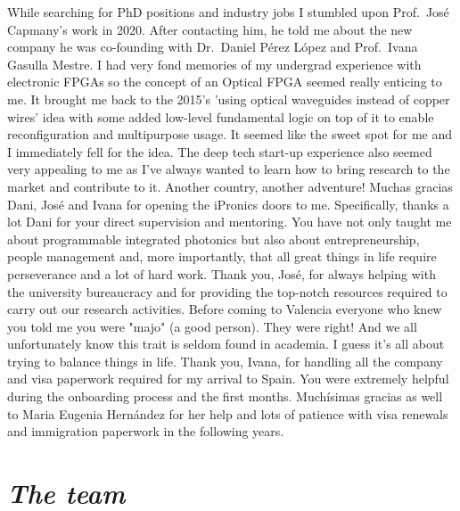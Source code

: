 While searching for PhD positions and industry jobs I stumbled upon Prof.~José Capmany's work in 2020.
After contacting him, he told me about the new company he was co-founding with Dr.~Daniel Pérez López and Prof.~Ivana Gasulla Mestre.
I had very fond memories of my undergrad experience with electronic FPGAs so the concept of an Optical FPGA seemed really enticing to me.
It brought me back to the 2015's 'using optical waveguides instead of copper wires' idea with some added low-level fundamental logic on top of it to enable reconfiguration and multipurpose usage.
It seemed like the sweet spot for me and I immediately fell for the idea.
The deep tech start-up experience also seemed very appealing to me as I've always wanted to learn how to bring research to the market and contribute to it.
Another country, another adventure!
Muchas gracias Dani, José and Ivana for opening the iPronics doors to me.
Specifically, thanks a lot Dani for your direct supervision and mentoring.
You have not only taught me about programmable integrated photonics but also about entrepreneurship, people management and, more importantly, that all great things in life require perseverance and a lot of hard work.
Thank you, José, for always helping with the university bureaucracy and for providing the top-notch resources required to carry out our research activities.
Before coming to Valencia everyone who knew you told me you were "majo" (a good person).
They were right!
And we all unfortunately know this trait is seldom found in academia.
I guess it's all about trying to balance things in life.
Thank you, Ivana, for handling all the company and visa paperwork required for my arrival to Spain.
You were extremely helpful during the onboarding process and the first months.
Muchísimas gracias as well to Maria Eugenia Hernández for her help and lots of patience with visa renewals and immigration paperwork in the following years.

\section*{\textit{The team}}

